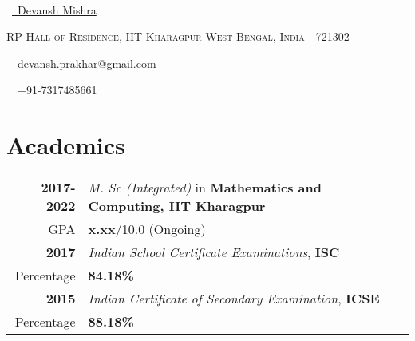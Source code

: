\documentclass[a4paper,10pt]{extarticle} %
\begin{document}
\pagestyle{empty} %


\begin{multicols}{3}
\normalsize {}\\
\normalsize  \faLinkedin\ {\href{https://www.linkedin.com/in/devansh-mishra-b3040453/}{\ Devansh Mishra}}\\
\columnbreak
\normalsize\par{\centering{\huge\textsc{\textcolor{primary}{Devansh Mishra}}}\par} %
\par{\centering\normalsize {\textsc{RP Hall of Residence, IIT Kharagpur    West Bengal, India - 721302}}\hfill\par}
\columnbreak
\raggedright\hfill\normalsize \faEnvelope\ {\href{mailto:devansh.prakhar@gmail.com}{\  devansh.prakhar@gmail.com}}\\
\raggedright\hfill{\faPhone\ \  +91-7317485661}
\end{multicols}
\vspace{-0.4 cm}


\vspace{-0.4cm}
\section{\textcolor{primary}{Academics}}

\begin{tabular}{r|p{17.5cm}}	
\textbf{2017-2022} & \textit{M. Sc (Integrated)} in \textbf{Mathematics and Computing, IIT Kharagpur}\\
\hfill GPA & \textbf{x.xx}/10.0 (Ongoing)\\
\textbf{2017} & \textit{Indian School Certificate Examinations}, \textbf{ISC}\\
\hfill Percentage & \textbf{84.18\%}\\
\textbf{2015} & \textit{Indian Certificate of Secondary Examination}, \textbf{ICSE}\\
\hfill Percentage & \textbf{88.18\%} \\
\end{tabular}
\end{document}
